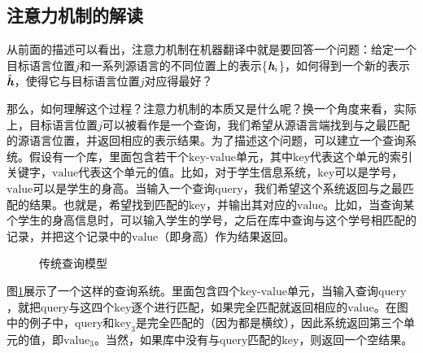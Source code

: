 \vspace{-2em}
\subsection{注意力机制的解读}
\label{sec:10.1.4}

\vspace{0.5em}
\parinterval 从前面的描述可以看出，注意力机制在机器翻译中就是要回答一个问题：给定一个目标语言位置$j$和一系列源语言的不同位置上的表示\{${\textbf{\em h}_i}$\}，如何得到一个新的表示$\hat{\textbf{\em h}}$，使得它与目标语言位置$j$对应得最好？

\parinterval 那么，如何理解这个过程？注意力机制的本质又是什么呢？换一个角度来看，实际上，目标语言位置$j$可以被看作是一个查询，我们希望从源语言端找到与之最匹配的源语言位置，并返回相应的表示结果。为了描述这个问题，可以建立一个查询系统。假设有一个库，里面包含若干个$\mathrm{key}$-$\mathrm{value}$单元，其中$\mathrm{key}$代表这个单元的索引关键字，$\mathrm{value}$代表这个单元的值。比如，对于学生信息系统，$\mathrm{key}$可以是学号，$\mathrm{value}$可以是学生的身高。当输入一个查询$\mathrm{query}$，我们希望这个系统返回与之最匹配的结果。也就是，希望找到匹配的$\mathrm{key}$，并输出其对应的$\mathrm{value}$。比如，当查询某个学生的身高信息时，可以输入学生的学号，之后在库中查询与这个学号相匹配的记录，并把这个记录中的$\mathrm{value}$（即身高）作为结果返回。

\begin{figure}[htp]
\centering

\caption{传统查询模型}
\label{fig:10-22}
\end{figure}

\parinterval 图\ref{fig:10-22}展示了一个这样的查询系统。里面包含四个$\mathrm{key}$-$\mathrm{value}$单元，当输入查询$\mathrm{query}$，就把$\mathrm{query}$与这四个$\mathrm{key}$逐个进行匹配，如果完全匹配就返回相应的$\mathrm{value}$。在图中的例子中，$\mathrm{query}$和$\mathrm{key}_3$是完全匹配的（因为都是横纹），因此系统返回第三个单元的值，即$\mathrm{value}_3$。当然，如果库中没有与$\mathrm{query}$匹配的$\mathrm{key}$，则返回一个空结果。

